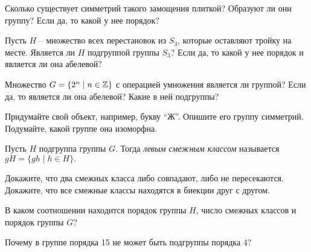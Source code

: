 \begin{tasks}
        Сколько существует симметрий такого замощения плиткой? Образуют ли они группу?
        Если да, то какой у нее порядок?
    \item Пусть $H$ -- множество всех перестановок из $S_3$, которые оставляют
        тройку на месте. Является ли $H$ подгруппой группы $S_3$?
        Если да, то какой у нее порядок и является ли она абелевой?
    \item Множество $G = \{2^n \mid n \in \mathbb Z\}$ с операцией умножения является ли группой?
        Если да, то является ли она абелевой? Какие в ней подгруппы?
    \item Придумайте свой объект, например, букву ``Ж''. Опишите его группу симметрий. Подумайте, какой группе она изоморфна.
    \item Пусть $H$ подгруппа группы $G$. Тогда \emph{левым смежным классом} называется \(gH =\{gh \mid h \in H\}.\)
        \begin{tasks}
        \item Докажите, что два смежных класса либо совпадают, либо не пересекаются.
        \moditem{*} Докажите, что все смежные классы находятся в биекции друг с другом.
        \item В каком соотношении находится порядок группы $H$, число смежных классов и порядок группы $G$?
        \item Почему в группе порядка 15 не может быть подгруппы порядка 4?
        \end{tasks}
\end{tasks}
